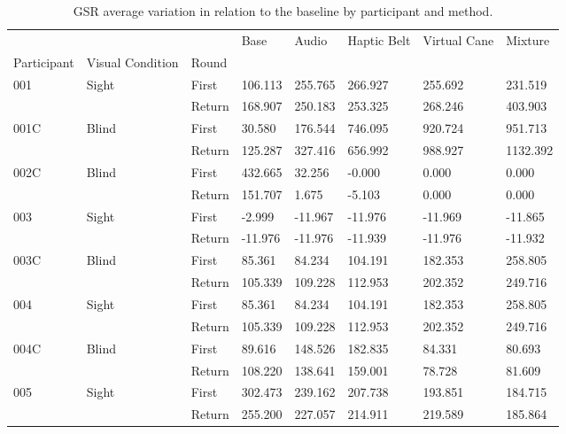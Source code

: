 
\begin{table}[!htb]
\centering
\caption{GSR average variation in relation to the baseline by participant and method.}
\label{tab:gsr_variation}
\begin{tabular}{llllllll}
\toprule
    &       &        &    Base &   Audio & Haptic Belt & Virtual Cane &  Mixture \\
Participant & Visual Condition & Round &         &         &             &              &          \\
\midrule
001 & Sight & First & 106.113 & 255.765 &     266.927 &      255.692 &  231.519 \\
    &       & Return & 168.907 & 250.183 &     253.325 &      268.246 &  403.903 \\
001C & Blind & First &  30.580 & 176.544 &     746.095 &      920.724 &  951.713 \\
    &       & Return & 125.287 & 327.416 &     656.992 &      988.927 & 1132.392 \\
002C & Blind & First & 432.665 &  32.256 &      -0.000 &        0.000 &    0.000 \\
    &       & Return & 151.707 &   1.675 &      -5.103 &        0.000 &    0.000 \\
003 & Sight & First &  -2.999 & -11.967 &     -11.976 &      -11.969 &  -11.865 \\
    &       & Return & -11.976 & -11.976 &     -11.939 &      -11.976 &  -11.932 \\
003C & Blind & First &  85.361 &  84.234 &     104.191 &      182.353 &  258.805 \\
    &       & Return & 105.339 & 109.228 &     112.953 &      202.352 &  249.716 \\
004 & Sight & First &  85.361 &  84.234 &     104.191 &      182.353 &  258.805 \\
    &       & Return & 105.339 & 109.228 &     112.953 &      202.352 &  249.716 \\
004C & Blind & First &  89.616 & 148.526 &     182.835 &       84.331 &   80.693 \\
    &       & Return & 108.220 & 138.641 &     159.001 &       78.728 &   81.609 \\
005 & Sight & First & 302.473 & 239.162 &     207.738 &      193.851 &  184.715 \\
    &       & Return & 255.200 & 227.057 &     214.911 &      219.589 &  185.864 \\
\bottomrule
\end{tabular}
\end{table}


